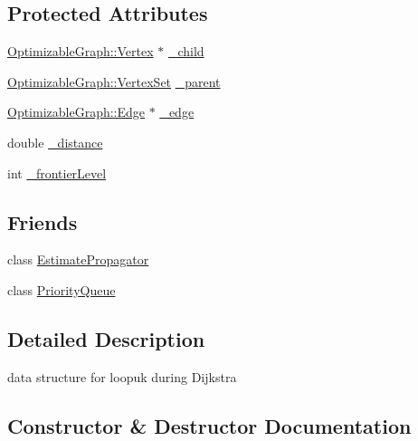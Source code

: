 \subsection*{Protected Attributes}
\begin{DoxyCompactItemize}
\item 
\mbox{\hyperlink{classg2o_1_1_optimizable_graph_1_1_vertex}{Optimizable\+Graph\+::\+Vertex}} $\ast$ \mbox{\hyperlink{classg2o_1_1_estimate_propagator_1_1_adjacency_map_entry_ab6f716e85cc15e6d9c570132fe889fd6}{\+\_\+child}}
\item 
\mbox{\hyperlink{classg2o_1_1_hyper_graph_a703938cdb4bb636860eed55a2489d70c}{Optimizable\+Graph\+::\+Vertex\+Set}} \mbox{\hyperlink{classg2o_1_1_estimate_propagator_1_1_adjacency_map_entry_a72384502361d60e1f3ae1644de1e7379}{\+\_\+parent}}
\item 
\mbox{\hyperlink{classg2o_1_1_optimizable_graph_1_1_edge}{Optimizable\+Graph\+::\+Edge}} $\ast$ \mbox{\hyperlink{classg2o_1_1_estimate_propagator_1_1_adjacency_map_entry_a738795d0b3989374ba51821354629d64}{\+\_\+edge}}
\item 
double \mbox{\hyperlink{classg2o_1_1_estimate_propagator_1_1_adjacency_map_entry_a3558503af9d9f56088ff1593398f86d4}{\+\_\+distance}}
\item 
int \mbox{\hyperlink{classg2o_1_1_estimate_propagator_1_1_adjacency_map_entry_a56bfab4074fa692f03378526007758f7}{\+\_\+frontier\+Level}}
\end{DoxyCompactItemize}
\subsection*{Friends}
\begin{DoxyCompactItemize}
\item 
class \mbox{\hyperlink{classg2o_1_1_estimate_propagator_1_1_adjacency_map_entry_a84fd16bbb058a331370b1b9983896264}{Estimate\+Propagator}}
\item 
class \mbox{\hyperlink{classg2o_1_1_estimate_propagator_1_1_adjacency_map_entry_afde21c6f1b41de5a73362b2fcfec056b}{Priority\+Queue}}
\end{DoxyCompactItemize}


\subsection{Detailed Description}
data structure for loopuk during Dijkstra 

\subsection{Constructor \& Destructor Documentation}
\mbox{\label{classg2o_1_1_estimate_propagator_1_1_adjacency_map_entry_a5fe6ab271c62be13c363ea3807e6d357}} 
